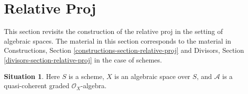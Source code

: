 \documentclass{stacks-project}
\theoremstyle{plain}
\theoremstyle{definition}
\newtheorem{situation}[subsection]{Situation}
\theoremstyle{remark}
\numberwithin{equation}{subsection}
\begin{document}
\section{Relative Proj}
\label{section-relative-proj}

\noindent
This section revisits the construction of the relative proj
in the setting of algebraic spaces. The material in this section
corresponds to the material in Constructions, Section
\ref{constructions-section-relative-proj}
and Divisors, Section \ref{divisors-section-relative-proj}
in the case of schemes.

\begin{situation}
\label{situation-relative-proj}
Here $S$ is a scheme, $X$ is an algebraic space over $S$, and
$\mathcal{A}$ is a quasi-coherent graded $\mathcal{O}_X$-algebra.
\end{situation}
\end{document}
